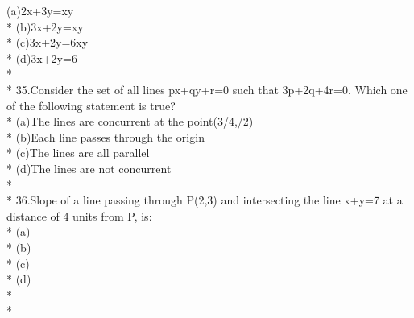 \documentclass{article}
\begin{document}
{(a)\enspace 2x+3y=xy\\*
(b)\enspace 3x+2y=xy\\*
(c)\enspace 3x+2y=6xy\\*
(d)\enspace 3x+2y=6\\*\\*
35.\enspace Consider the set of all lines px+qy+r=0 such that 3p+2q+4r=0. Which one of the following statement is true?\\*
(a)\enspace The lines are concurrent at the point(3/4,/2)\\*
(b)\enspace Each line passes through the origin\\*
(c)\enspace The lines are all parallel\\*
(d)\enspace The lines are not concurrent\\*\\*
36.\enspace Slope of a line passing through P(2,3) and intersecting the line x+y=7 at a distance of 4 units from P, is:\\*
(a)\\*
(b)\\*
(c)\\*
(d)\\*\\*
}
\end{document}
